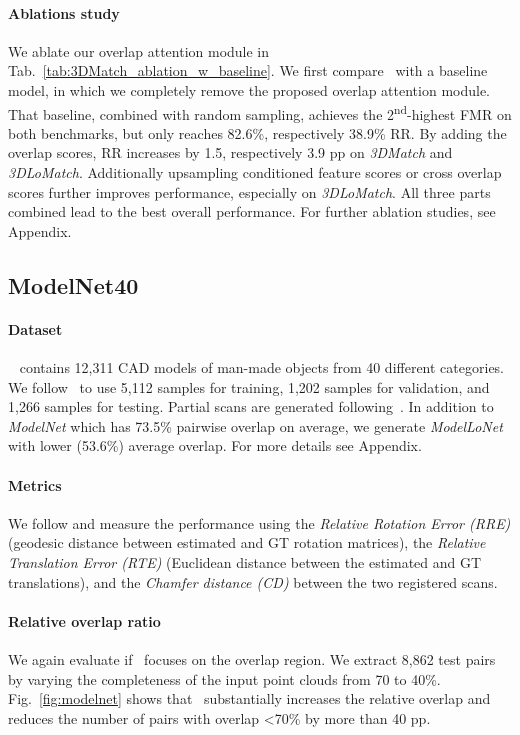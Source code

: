 \paragraph{Ablations study}
We ablate our overlap attention module in Tab.~\ref{tab:3DMatch_ablation_w_baseline}.
We first compare \acro\ with a baseline model, in which we completely remove the proposed overlap attention module. That baseline, combined with random sampling, achieves the 2\textsuperscript{nd}-highest FMR on both benchmarks, but only reaches 82.6\%, respectively 38.9\% RR.
By adding the overlap scores, RR increases by 1.5, respectively 3.9 pp on \emph{3DMatch} and \emph{3DLoMatch}. Additionally upsampling conditioned feature scores or cross overlap scores further improves performance, especially on \emph{3DLoMatch}. All three parts combined lead to the best overall performance. For further ablation studies, see Appendix.


\subsection{ModelNet40}
\label{sec:model_net}
\paragraph{Dataset}
~\cite{wu2015ModelNet} contains 12,311 CAD models of man-made objects from 40 different categories. We follow~\cite{yew2020rpm} to use 5,112 samples for training, 1,202 samples for validation, and 1,266 samples for testing. Partial scans are generated following~\cite{yew2020rpm}. In addition to \emph{ModelNet} which has 73.5\% pairwise overlap on average, we generate \emph{ModelLoNet} with lower (53.6\%) average overlap. For more details see Appendix. 

\paragraph{Metrics}
We follow \cite{yew2020rpm} and measure the performance using the \emph{Relative Rotation Error (RRE)} (geodesic distance between estimated and GT rotation matrices), the \emph{Relative Translation Error (RTE)} (Euclidean distance between the estimated and GT translations), and the \emph{Chamfer distance (CD)} between the two registered scans.

\paragraph{Relative overlap ratio} 

We again evaluate if \acro\ focuses on the overlap region. We extract 8,862 test pairs by varying the completeness of the input point clouds from 70 to 40\%. Fig.~\ref{fig:modelnet} shows that \acro\ substantially increases the relative overlap and reduces the number of pairs with overlap \textless70\% by more than 40 pp.

